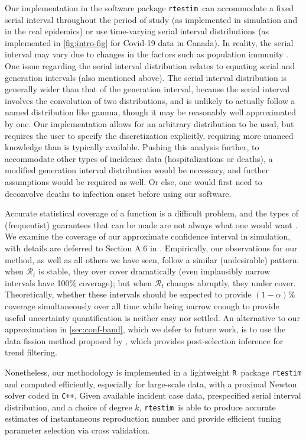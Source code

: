 \documentclass[10pt,letterpaper]{article}
\newcommand{\R}{\texttt{R}}
\newcommand{\cpp}{\texttt{C++}}
\def\RtEstim{\texttt{rtestim}}
\begin{document}
Our implementation in the software package \RtEstim\ can accommodate a fixed
serial interval throughout the period of study (as implemented in simulation and
in the real epidemics) or use time-varying serial interval distributions (as
implemented in \autoref{fig:intro-fig} for Covid-19 data in Canada). In reality,
the serial interval may vary due to changes in the factors such as population
immunity \cite{nash2023estimating}. One issue regarding the serial interval
distribution relates to equating serial and generation intervals (also mentioned
above). The serial interval distribution is generally wider than that of the
generation interval, because the serial interval involves the convolution of two
distributions, and is unlikely to actually follow a named distribution like
gamma, though it may be reasonably well approximated by one. Our implementation
allows for an arbitrary distribution to be used, but requires the user to
specify the discretization explicitly, requiring more nuanced knowledge than is
typically available. Pushing this analysis further, to accommodate other types
of incidence data (hospitalizations or deaths), a modified generation interval
distribution would be necessary, and further assumptions would be required as
well. Or else, one would first need to deconvolve deaths to infection onset
before using our software.


Accurate statistical coverage of a function is a difficult problem, and the
types of (frequentist) guarantees that can be made are not always what one would
want \cite{genovese2008adaptive}. We examine the coverage of our approximate
confidence interval in simulation, with details are deferred to Section A.6 in
. Empirically, our observations for our method, as well as all
others we have seen, follow a similar (undesirable) pattern: when
$\mathcal{R}_t$ is stable, they over cover dramatically (even implausibly narrow
intervals have 100\% coverage); but when $\mathcal{R}_t$ changes abruptly, they
under cover. Theoretically, whether these intervals should be expected to
provide $(1-\alpha)\%$ coverage simultaneously over all time while being narrow
enough to provide useful uncertainty quantification is neither easy nor settled.
An alternative to our approximation in \autoref{sec:conf-band}, which we defer
to future work, is to use the data fission method proposed by
\cite{leiner2023data}, which provides post-selection inference for trend
filtering.


Nonetheless, our methodology is implemented in a lightweight \R\ package
\texttt{rtestim} and computed efficiently, especially for large-scale data, with
a proximal Newton solver coded in \cpp. Given available incident case data,
prespecified serial interval distribution, and a choice of degree $k$, \RtEstim\
is able to produce accurate estimates of instantaneous reproduction number and
provide efficient tuning parameter selection via cross validation. 
\end{document}
